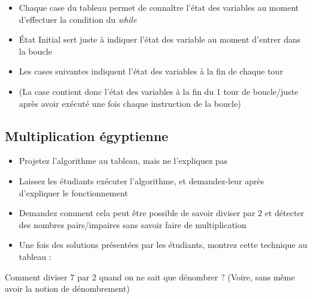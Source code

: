 \documentclass[11pt,a4paper]{article}
\begin{document}
\begin{itemize}
\item Chaque case du tableau permet de connaître l'état des variables au moment d'effectuer la condition du \textit{while}
\item \og \'Etat Initial \fg{} sert juste à indiquer l'état des variable au moment d'entrer dans la boucle
\item Les cases suivantes indiquent l'état des variables à la fin de chaque tour
\item (La case  \fg{} contient donc l'état des variables à la fin du 1 tour de boucle/juste après avoir exécuté une fois chaque instruction de la boucle)
\end{itemize}

\vfillFirst

\vfillLast



\subsection{Multiplication égyptienne}

\bigskip

\begin{itemize}
\item Projetez l'algorithme au tableau, mais ne l'expliquez pas
\item Laissez les étudiants exécuter l'algorithme, et demandez-leur après d'expliquer le fonctionnement
\end{itemize}


\medskip

\begin{itemize}
\item Demandez comment cela peut être possible de savoir diviser par 2 et détecter des nombres pairs/impaires sans savoir faire de multiplication
\item Une fois des solutions présentées par les étudiants, montrez cette technique au tableau :
\end{itemize}


Comment diviser 7 par 2 quand on ne sait que dénombrer ? (Voire, sans même avoir la notion de dénombrement)
\end{document}
